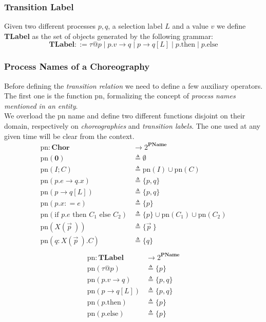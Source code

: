 \documentclass[12pt,a4paper,twoside]{book}
\makeatletter
\newcommand{\metaDef}{\mathrel{\mathop:}=}
\newcommand{\tlint}[1]{\tau@#1}
\newcommand{\tlthen}[1]{#1\text{.then}}
\newcommand{\tlelse}[1]{#1\text{.else}}
\newcommand{\gencom}{p.e \rightarrow q.x}
\newcommand{\gensel}{p \rightarrow q[L]}
\newcommand{\pn}{\mathrm{pn}}
\makeatother
\begin{document}
\subsubsection{Transition Label}
Given two different processes $p, q$, a selection label $L$ and a value $v$ we define \textbf{TLabel} as the set of objects generated by the following grammar:
$$
\textbf{TLabel} ::= \tlint{p} \mid p.v \rightarrow q \mid \gensel \mid \tlthen{p} \mid \tlelse{p}
$$

\subsubsection{Process Names of a Choreography}
Before defining the \textit{transition relation} we need to define a few auxiliary operators.\\
The first one is the function $\pn$, formalizing the concept of \textit{process names mentioned in an entity}.\\
We overload the $\pn$ name and define two different functions disjoint on their domain, respectively on \textit{choreographies} and \textit{transition labels}.
The one used at any given time will be clear from the context.
\begin{align*}
	\pn : \textbf{Chor} &\longrightarrow 2^\textbf{PName}\\
	\pn(\boldsymbol{0}) &\triangleq \emptyset\\
    \pn(I; C) &\triangleq \pn(I) \cup \pn(C)\\
    \pn(\gencom) &\triangleq \{p, q\}\\
    \pn(\gensel) &\triangleq \{p, q\}\\
    \pn(p.x \metaDef e) &\triangleq \{p\}\\
	\pn(\text{if } p.e \text{ then } C_1 \text{ else } C_2) &\triangleq \{p\} \cup \pn(C_1) \cup \pn(C_2)\\
    \pn(X(\vec{p}~)) &\triangleq \{\vec{p}~\}\\
    \pn(q : X(\vec{p}~).C ) &\triangleq \{q\}\\
\end{align*}
\begin{align*}
	\pn : \textbf{TLabel} &\longrightarrow 2^\textbf{PName}\\
	\pn(\tlint{p}) &\triangleq \{ p \}\\
    \pn(p.v \rightarrow q) &\triangleq \{p , q\}\\
    \pn(\gensel) &\triangleq \{p , q\}\\
    \pn(\tlthen{p}) &\triangleq \{ p \}\\
    \pn(\tlelse{p}) &\triangleq \{ p \}\\
\end{align*}
\end{document}
